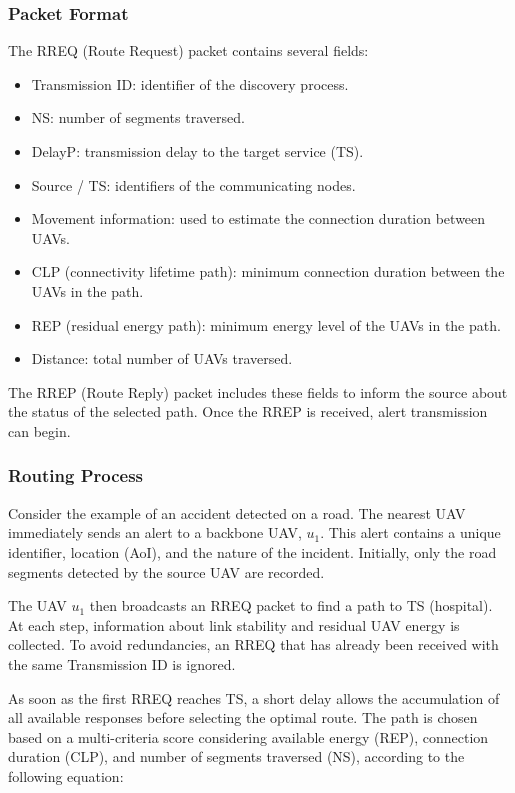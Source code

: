 \subsubsection{Packet Format}
The RREQ (Route Request) packet contains several fields:
\begin{itemize}
    \item Transmission ID: identifier of the discovery process.
    \item NS: number of segments traversed.
    \item DelayP: transmission delay to the target service (TS).
    \item Source / TS: identifiers of the communicating nodes.
    \item Movement information: used to estimate the connection duration between UAVs.
    \item CLP (connectivity lifetime path): minimum connection duration between the UAVs in the path.
    \item REP (residual energy path): minimum energy level of the UAVs in the path.
    \item Distance: total number of UAVs traversed.
\end{itemize}

The RREP (Route Reply) packet includes these fields to inform the source about the status of the selected path. Once the RREP is received, alert transmission can begin.

\subsubsection{Routing Process}
Consider the example of an accident detected on a road. The nearest UAV immediately sends an alert to a backbone UAV, \( u_1 \). This alert contains a unique identifier, location (AoI), and the nature of the incident. Initially, only the road segments detected by the source UAV are recorded.

The UAV \( u_1 \) then broadcasts an RREQ packet to find a path to TS (hospital). At each step, information about link stability and residual UAV energy is collected. To avoid redundancies, an RREQ that has already been received with the same Transmission ID is ignored.

As soon as the first RREQ reaches TS, a short delay allows the accumulation of all available responses before selecting the optimal route. The path is chosen based on a multi-criteria score considering available energy (REP), connection duration (CLP), and number of segments traversed (NS), according to the following equation:

